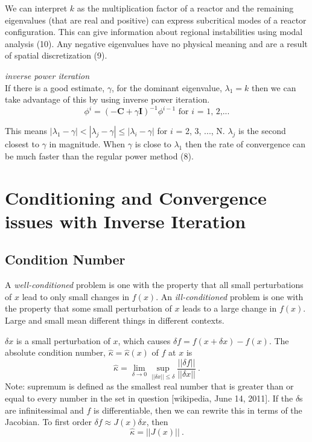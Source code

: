 \documentclass[12pt,twoside]{book}
\begin{document}
We can interpret $k$ as the multiplication factor of a reactor and the remaining eigenvalues (that are real and positive) can express subcritical modes of a reactor configuration. This can give information about regional instabilities using modal analysis (10). Any negative eigenvalues have no physical meaning and are a result of spatial discretization (9).  

\emph{inverse power iteration}\\
If there is a good estimate, $\gamma$, for the dominant eigenvalue, $\lambda_{1} = k$ then we can take advantage of this by using inverse power iteration. 
\begin{equation}
  \phi^{i} = (-\mathbf{C} + \gamma\mathbf{I})^{-1} \phi^{i-1} \text{   for } i \text{ = 1, 2,...}
\end{equation}  

This means $|\lambda_{1} - \gamma| < |\lambda_{j} - \gamma| \le |\lambda_{i} - \gamma|$ for $i$ = 2, 3, ..., N. $\lambda_{j}$ is the second closest to $\gamma$ in magnitude. When $\gamma$ is close to $\lambda_{1}$ then the rate of convergence can be much faster than the regular power method (8). 

\section{Conditioning and Convergence issues with Inverse Iteration}

\subsection{Condition Number}
A \emph{well-conditioned} problem is one with the property that all small perturbations of $x$ lead to only small changes in $f(x)$. An \emph{ill-conditioned} problem is one with the property that some small perturbation of $x$ leads to a large change in $f(x)$. Large and small mean different things in different contexts. 

$\delta x$ is a small perturbation of $x$, which causes $\delta f = f(x + \delta x) - f(x)$. The absolute condition number, $\hat{\kappa} = \hat{\kappa}(x)$ of $f$ at $x$ is
%
\begin{equation}
  \hat{\kappa} = \lim_{\delta \rightarrow 0} \sup_{||\delta x|| \le \delta} \frac{||\delta f||}{||\delta x||} \:.
\end{equation}
%
Note: supremum is defined as the smallest real number that is greater than or equal to every number in the set in question [wikipedia, June 14, 2011]. If the $\delta$s are infinitessimal and $f$ is differentiable, then we can rewrite this in terms of the Jacobian. To first order $\delta f \approx J(x) \delta x$, then
%
\begin{equation}
  \hat{\kappa} = ||J(x)|| \:.
\end{equation}
\end{document}
